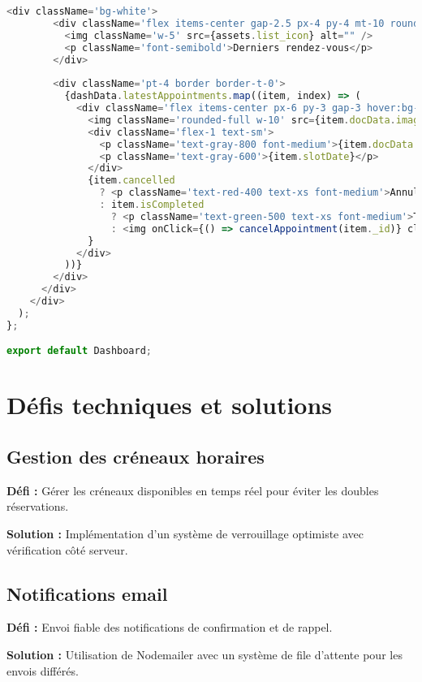 \begin{lstlisting}[language=JavaScript, caption=Dashboard admin]
      <div className='bg-white'>
        <div className='flex items-center gap-2.5 px-4 py-4 mt-10 rounded-t border'>
          <img className='w-5' src={assets.list_icon} alt="" />
          <p className='font-semibold'>Derniers rendez-vous</p>
        </div>
        
        <div className='pt-4 border border-t-0'>
          {dashData.latestAppointments.map((item, index) => (
            <div className='flex items-center px-6 py-3 gap-3 hover:bg-gray-50' key={index}>
              <img className='rounded-full w-10' src={item.docData.image} alt="" />
              <div className='flex-1 text-sm'>
                <p className='text-gray-800 font-medium'>{item.docData.name}</p>
                <p className='text-gray-600'>{item.slotDate}</p>
              </div>
              {item.cancelled 
                ? <p className='text-red-400 text-xs font-medium'>Annulé</p>
                : item.isCompleted 
                  ? <p className='text-green-500 text-xs font-medium'>Terminé</p>
                  : <img onClick={() => cancelAppointment(item._id)} className='w-10 cursor-pointer' src={assets.cancel_icon} alt="" />
              }
            </div>
          ))}
        </div>
      </div>
    </div>
  );
};

export default Dashboard;
\end{lstlisting}

\section{Défis techniques et solutions}

\subsection{Gestion des créneaux horaires}

\textbf{Défi :} Gérer les créneaux disponibles en temps réel pour éviter les doubles réservations.

\textbf{Solution :} Implémentation d'un système de verrouillage optimiste avec vérification côté serveur.

\subsection{Notifications email}

\textbf{Défi :} Envoi fiable des notifications de confirmation et de rappel.

\textbf{Solution :} Utilisation de Nodemailer avec un système de file d'attente pour les envois différés.

